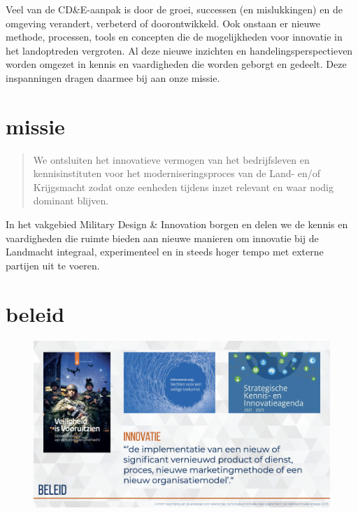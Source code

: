 \documentclass[
]{book}
\begin{document}
Veel van de CD\&E-aanpak is door de groei, successen (en mislukkingen) en de omgeving verandert, verbeterd of doorontwikkeld. Ook onstaan er nieuwe methode, processen, tools en concepten die de mogelijkheden voor innovatie in het landoptreden vergroten. Al deze nieuwe inzichten en handelingsperspectieven worden omgezet in kennis en vaardigheden die worden geborgt en gedeelt. Deze inspanningen dragen daarmee bij aan onze missie.

\hypertarget{missie}{%
\section{missie}\label{missie}}

\begin{quote}
We ontsluiten het innovatieve vermogen van het bedrijfsleven en kennisinstituten voor het moderniseringsproces van de Land- en/of Krijgsmacht zodat onze eenheden tijdens inzet relevant en waar nodig dominant blijven.
\end{quote}

In het vakgebied Military Design \& Innovation borgen en delen we de kennis en vaardigheden die ruimte bieden aan nieuwe manieren om innovatie bij de Landmacht integraal, experimenteel en in steeds hoger tempo met externe partijen uit te voeren.

\hypertarget{beleid}{%
\section{beleid}\label{beleid}}

\begin{figure}

{\centering \includegraphics[width=0.7\linewidth]{data/keynote-slides/20200430-CDE-Designprocess/20200430-CDE-Designprocess.005} 

}

\caption{ }\label{fig:unnamed-chunk-3}
\end{figure}
\end{document}
